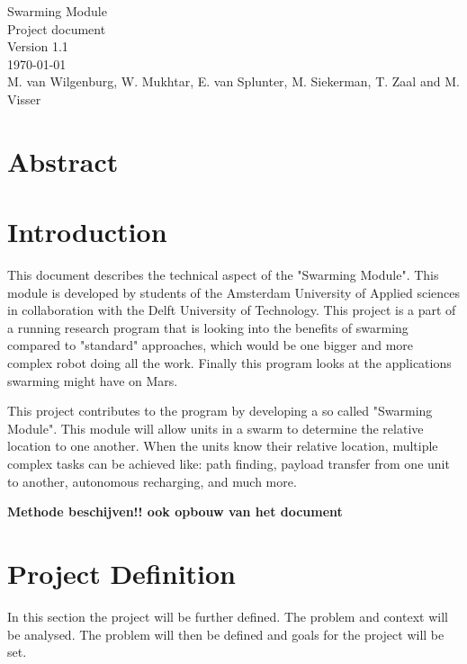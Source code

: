\documentclass[10pt,a4paper]{article}
\begin{document}
\begin{titlepage}
    \centering
    \vfill
    {\Large

    Swarming Module\\

   
    {\small Project document}\\
    {\small Version 1.1}\\
    {\small \today}\\
        
        \vskip2cm
        {\small M. van Wilgenburg, W. Mukhtar, E. van Splunter, M. Siekerman, T. Zaal and M. Visser}\\
    }    
    \vfill
    
    \vfill
    \vfill
\end{titlepage}

\newpage

\listoffigures
\newpage

\listoftables
\newpage

\tableofcontents
\newpage

\section{Abstract}
\newpage

\section{Introduction}
This document describes the technical aspect of the "Swarming Module". This module is developed by students of the Amsterdam University of Applied sciences in collaboration with the Delft University of Technology.   This project is a part of a running research program that is looking into the benefits of swarming compared to "standard" approaches, which would be one bigger and more complex robot doing all the work. Finally this program looks at the applications swarming might have on Mars. 

This project contributes to the program by developing a so called "Swarming Module". This module will allow units in a swarm to determine the relative location to one another. When the units know their relative location, multiple complex tasks can be achieved like: path finding, payload transfer from one unit to another, autonomous recharging, and much more. 

\textbf{Methode beschijven!! ook opbouw van het document}

\section{Project Definition}
In this section the project will be further defined. The problem and context will be analysed. The problem will then be defined and goals for the project will be set.
\end{document}
